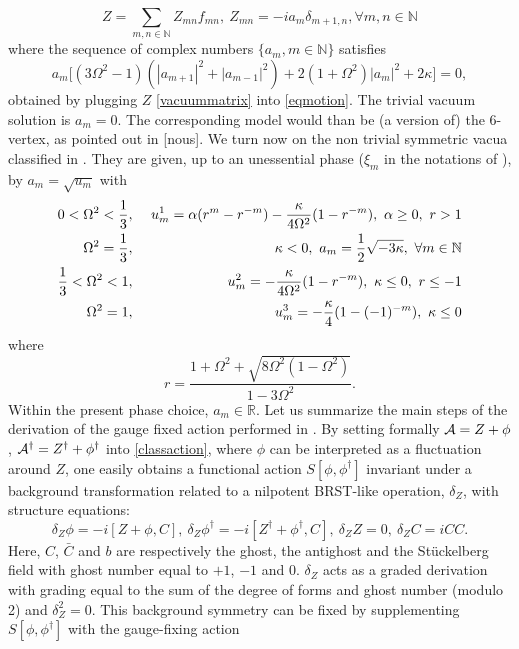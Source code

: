 \documentclass[a4paper,11pt,twoside]{article}
\numberwithin{equation}{section}
\theoremstyle{nonumberplain}
\newcounter{and}
\begin{document}
\begin{equation}
Z=\sum_{m,n\in\mathbb{N}}Z_{mn}f_{mn},\ Z_{mn}=-ia_{m}\delta_{m+1,n}, \forall m,n\in\mathbb{N}\label{vacuummatrix}
\end{equation}
where  the sequence of complex numbers $\{a_m, m\in\mathbb{N}\}$ satisfies
\begin{equation}
a_m\big[(3\Omega^2-1)(|a_{m+1}|^2+|a_{m-1}|^2)+2(1+\Omega^2)|a_m|^2+2\kappa  \big]=0,\label{recursive}
\end{equation}
obtained by plugging $Z$ \eqref{vacuummatrix} into \eqref{eqmotion}. The trivial vacuum solution is $a_m=0$. The corresponding model would than be (a version of) the 6-vertex, as pointed out in [nous]. We turn now on the non trivial symmetric vacua classified in \cite{GWW2}. They are given, up to an unessential phase ($\xi_m$ in the notations of \cite{GWW2}), by $a_m=\sqrt{u_m}$ with
\begin{eqnarray}
0<\Omega^2<\frac{1}{3}&,&\ u^1_m=\alpha(r^m-r^{-m})-\frac{\kappa}{4\Omega^2}(1-r^{-m}),\ \alpha\ge0,\ r>1\label{vac11}\\
\Omega^2={{1}\over{3}}&,&\ \kappa<0,\ a_m={{1}\over{2}}{\sqrt{ -3\kappa}},\ \forall m\in\mathbb{N}\label{sol1}\\
\frac{1}{3}<\Omega^2<1&,&\ u^2_m=-\frac{\kappa}{4\Omega^2}(1-r^{-m}),\ \kappa\le0,\ r\le-1\label{vac12}\\
\Omega^2=1&,&\ u^3_m=-\frac{\kappa}{4}(1-(-1)^{-m})\label{vac13},\ \kappa\le0
\end{eqnarray}
where
\begin{equation}
r=\frac{1+\Omega^2+\sqrt{8\Omega^2(1-\Omega^2)}}{1-3\Omega^2}\label{err}.
\end{equation}
Within the present phase choice, $a_m\in\mathbb{R}$. Let us summarize the main steps of the derivation of the gauge fixed action performed in \cite{MVW13}. By setting formally ${\cal{A}}=Z+\phi$, ${\cal{A}}^\dag=Z^\dag+\phi^\dag$ into \eqref{classaction}, where $\phi$ can be interpreted as a fluctuation around $Z$, one easily obtains a functional action $S[\phi,\phi^\dag]$ invariant under a background transformation related to a nilpotent BRST-like operation, $\delta_Z$, with structure equations:
\begin{equation}
\delta_Z\phi=-i[Z+\phi,C],\ \delta_Z\phi^\dag=-i[Z^\dag+\phi^\dag,C],\ \delta_ZZ=0,\ \delta_ZC=iCC\label{brsbackgrd}.
\end{equation}
Here, $C$, ${\bar{C}}$ and $b$ are respectively the ghost, the antighost and the St\"uckelberg field with ghost number equal to $+1$, $-1$ and $0$. $\delta_Z$ acts as a graded derivation with grading equal to the sum of the degree of forms and ghost number (modulo 2) and $\delta_Z^2=0$. This background symmetry can be fixed by supplementing $S[\phi,\phi^\dag]$ with the gauge-fixing action
\end{document}
